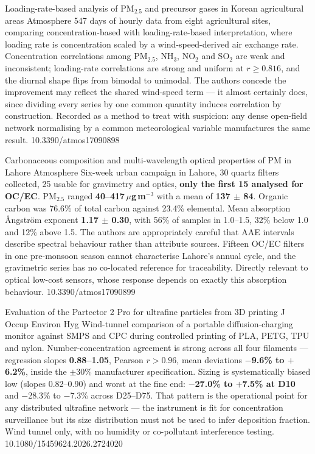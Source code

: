 \documentclass[10pt]{article}
\begin{document}
{Loading-rate-based analysis of PM$_{2.5}$ and precursor gases in Korean agricultural areas}
{Atmosphere}
{547 days of hourly data from eight agricultural sites, comparing concentration-based with
loading-rate-based interpretation, where loading rate is concentration scaled by a
wind-speed-derived air exchange rate. Concentration correlations among PM$_{2.5}$,
NH$_3$, NO$_2$ and SO$_2$ are weak and inconsistent; loading-rate correlations are strong
and uniform at \textbf{$r \ge 0.816$}, and the diurnal shape flips from bimodal to
unimodal. The authors concede the improvement may reflect the shared wind-speed term ---
it almost certainly does, since dividing every series by one common quantity induces
correlation by construction. Recorded as a method to treat with suspicion: any dense
open-field network normalising by a common meteorological variable manufactures the same
result.}
{10.3390/atmos17090898}

{Carbonaceous composition and multi-wavelength optical properties of PM in Lahore}
{Atmosphere}
{Six-week urban campaign in Lahore, 30 quartz filters collected, 25 usable for gravimetry
and optics, \textbf{only the first 15 analysed for OC/EC}. PM$_{2.5}$ ranged
\textbf{40--417\,$\mu$g\,m$^{-3}$} with a mean of \textbf{137 $\pm$ 84}. Organic carbon
was 76.6\% of total carbon against 23.4\% elemental. Mean absorption \r{A}ngstr\"om
exponent \textbf{1.17 $\pm$ 0.30}, with 56\% of samples in 1.0--1.5, 32\% below 1.0 and
12\% above 1.5. The authors are appropriately careful that AAE intervals describe spectral
behaviour rather than attribute sources. Fifteen OC/EC filters in one pre-monsoon season
cannot characterise Lahore's annual cycle, and the gravimetric series has no co-located
reference for traceability. Directly relevant to optical low-cost sensors, whose response
depends on exactly this absorption behaviour.}
{10.3390/atmos17090899}


{Evaluation of the Partector 2 Pro for ultrafine particles from 3D printing}
{J Occup Environ Hyg}
{Wind-tunnel comparison of a portable diffusion-charging monitor against SMPS and CPC
during controlled printing of PLA, PETG, TPU and nylon. Number-concentration agreement is
strong across all four filaments --- regression slopes \textbf{0.88--1.05}, Pearson
$r > 0.96$, mean deviations \textbf{$-$9.6\% to $+$6.2\%}, inside the $\pm$30\%
manufacturer specification. Sizing is systematically biased low (slopes 0.82--0.90) and
worst at the fine end: \textbf{$-$27.0\% to $+$7.5\% at D10} and $-$28.3\% to $-$7.3\%
across D25--D75. That pattern is the operational point for any distributed ultrafine
network --- the instrument is fit for concentration surveillance but its size distribution
must not be used to infer deposition fraction. Wind tunnel only, with no humidity or
co-pollutant interference testing.}
{10.1080/15459624.2026.2724020}
\end{document}
